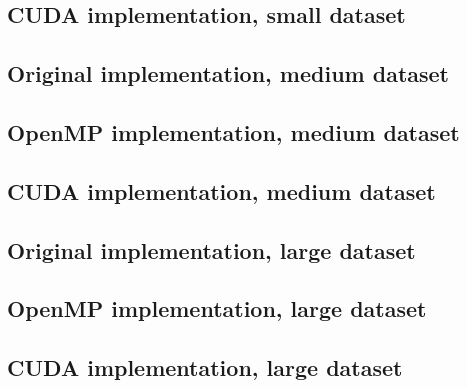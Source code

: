 \documentclass[11pt]{article}
\begin{document}
\subsection{CUDA implementation, small dataset}


\subsection{Original implementation, medium dataset}

\subsection{OpenMP implementation, medium dataset}

\subsection{CUDA implementation, medium dataset}


\subsection{Original implementation, large dataset}

\subsection{OpenMP implementation, large dataset}

\subsection{CUDA implementation, large dataset}

\end{document}
